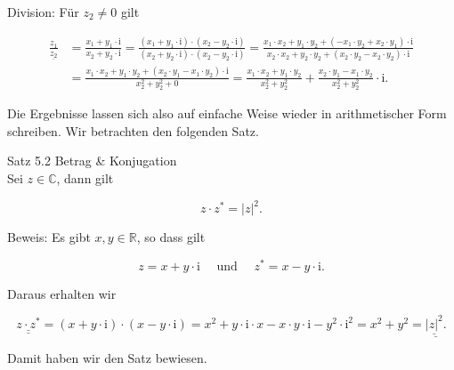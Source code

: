 \documentclass[10pt]{article}
\begin{document}
Division: Für $z_{2} \neq 0$ gilt


\begin{align*}
\frac{z_{1}}{\underline{z_{2}}} & =\frac{x_{1}+y_{1} \cdot \mathrm{i}}{x_{2}+y_{2} \cdot \mathrm{i}}=\frac{\left(x_{1}+y_{1} \cdot \mathrm{i}\right) \cdot\left(x_{2}-y_{2} \cdot \mathrm{i}\right)}{\left(x_{2}+y_{2} \cdot \mathrm{i}\right) \cdot\left(x_{2}-y_{2} \cdot \mathrm{i}\right)}=\frac{x_{1} \cdot x_{2}+y_{1} \cdot y_{2}+\left(-x_{1} \cdot y_{2}+x_{2} \cdot y_{1}\right) \cdot \mathrm{i}}{x_{2} \cdot x_{2}+y_{2} \cdot y_{2}+\left(x_{2} \cdot y_{2}-x_{2} \cdot y_{2}\right) \cdot \mathrm{i}} \\
& =\frac{x_{1} \cdot x_{2}+y_{1} \cdot y_{2}+\left(x_{2} \cdot y_{1}-x_{1} \cdot y_{2}\right) \cdot \mathrm{i}}{x_{2}^{2}+y_{2}^{2}+0}=\frac{x_{1} \cdot x_{2}+y_{1} \cdot y_{2}}{x_{2}^{2}+y_{2}^{2}}+\frac{x_{2} \cdot y_{1}-x_{1} \cdot y_{2}}{x_{2}^{2}+y_{2}^{2}} \cdot \mathrm{i} . \tag{5.11}
\end{align*}


Die Ergebnisse lassen sich also auf einfache Weise wieder in arithmetischer Form schreiben. Wir betrachten den folgenden Satz.

Satz 5.2 Betrag \& Konjugation\\
Sei $z \in \mathbb{C}$, dann gilt


\begin{equation*}
z \cdot z^{*}=|z|^{2} . \tag{5.12}
\end{equation*}


Beweis: Es gibt $x, y \in \mathbb{R}$, so dass gilt


\begin{equation*}
z=x+y \cdot \mathrm{i} \quad \text { und } \quad z^{*}=x-y \cdot \mathrm{i} . \tag{5.13}
\end{equation*}


Daraus erhalten wir


\begin{equation*}
\underline{\underline{z \cdot z^{*}}}=(x+y \cdot \mathrm{i}) \cdot(x-y \cdot \mathrm{i})=x^{2}+y \cdot \mathrm{i} \cdot x-x \cdot y \cdot \mathrm{i}-y^{2} \cdot \mathrm{i}^{2}=x^{2}+y^{2}=\underline{\underline{|z|^{2}} .} \tag{5.14}
\end{equation*}


Damit haben wir den Satz bewiesen.
\end{document}
